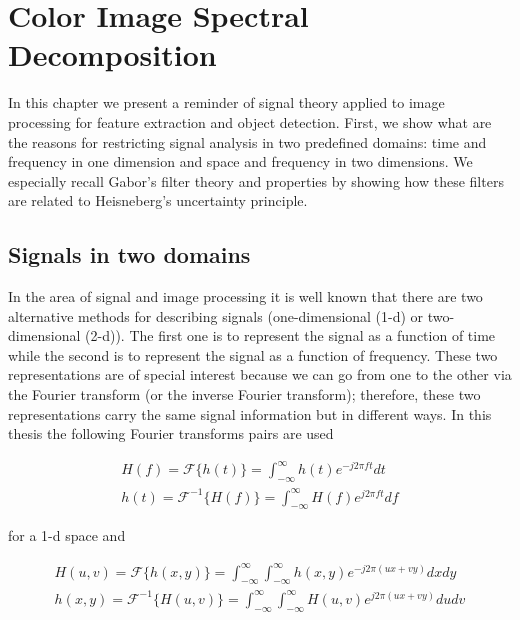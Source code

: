 
\chapter{Color Image Spectral Decomposition}

In this chapter we present a reminder of signal theory applied to image processing for feature extraction and object detection. First, we show what are the reasons for restricting signal analysis in two predefined domains: time and frequency in one dimension and space and frequency in two dimensions. We especially recall Gabor's filter theory and properties by showing how these filters are related to Heisneberg's uncertainty principle.

\section{Signals in two domains}

In the area of signal and image processing it is well known that there are two alternative methods for describing signals (one-dimensional (1-d) or two-dimensional (2-d)). The first one is to represent the signal as a function of time while the second is to represent the signal as a function of frequency. These two representations are of special interest because we can go from one to the other via the Fourier transform (or the inverse Fourier transform); therefore, these two representations carry the same signal information but in different ways. In this thesis the following Fourier transforms pairs are used

\begin{equation}\label{eq:fourier_transforms_1d}
    \begin{gathered}
        H(f) = \mathcal{F}\{h(t)\} = \int_{-\infty}^{\infty} h(t) e^{-j2\pi f t} dt \\
        h(t) = \mathcal{F}^{-1}\{H(f)\} = \int_{-\infty}^{\infty} H(f) e^{j2\pi f t} df 
    \end{gathered}
\end{equation}

for a 1-d space and 

\begin{equation}\label{eq:fourier_transforms_2d}
    \begin{gathered}
        H(u, v) = \mathcal{F}\{h(x, y)\} = \int_{-\infty}^{\infty} \int_{-\infty}^{\infty} h(x, y) e^{-j2\pi (ux + vy)} dx dy \\
        h(x, y) = \mathcal{F}^{-1}\{H(u, v)\} = \int_{-\infty}^{\infty} \int_{-\infty}^{\infty}  H(u, v) e^{j2\pi (ux + vy)} du dv 
    \end{gathered}
\end{equation}

